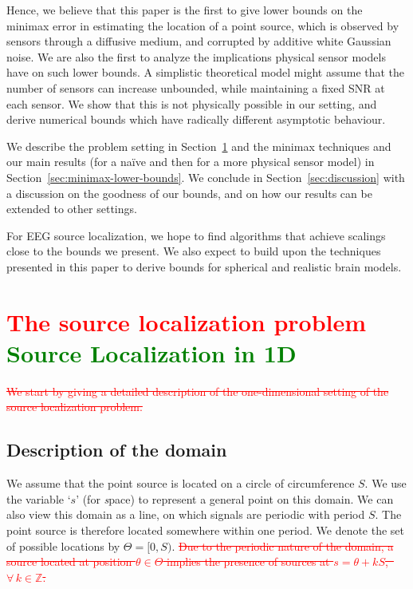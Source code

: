 \documentclass[conference,letterpaper]{IEEEtran}
\begin{document}
Hence, we believe that this paper is the first to give lower bounds on the
minimax error in estimating the location of a point source, which is observed
by sensors through a diffusive medium, and corrupted by additive white Gaussian
noise. We are also the first to analyze the implications physical sensor models
have on such lower bounds. A simplistic theoretical model might assume that the
number of sensors can increase unbounded, while maintaining a fixed SNR at each
sensor. We show that this is not physically possible in our setting, and derive
numerical bounds which have radically different asymptotic behaviour.

We describe the problem setting in Section~\ref{sec:source-localization} and
the minimax techniques and our main results (for a na\"ive and then for a more
physical sensor model) in Section~\ref{sec:minimax-lower-bounds}. We conclude
in Section~\ref{sec:discussion} with a discussion on the goodness of our
bounds, and on how our results can be extended to other settings.

For EEG source localization, we hope to find algorithms that achieve scalings
close to the bounds we present.  We also expect to build upon the techniques
presented in this paper to derive bounds for spherical and realistic brain
models.

\section{\textcolor{red}{The source localization problem} \textcolor{green}{Source Localization in 1D}}
\label{sec:source-localization}

\textcolor{red}{\sout{We start by giving a detailed description of the one-dimensional setting of the
source localization problem.}}

\subsection{Description of the domain}

We assume that the point source is located on a circle of circumference $S$. We
use the variable `$s$' (for \emph{s}pace) to represent a general point on this
domain. We can also view this domain as a line, on which signals are periodic
with period $S$.  The point source is therefore located somewhere within one
period. We denote the set of possible locations by $\Theta = [0, S)$.
\textcolor{red}{\sout{Due to
the periodic nature of the domain, a source located at position $\theta \in
\Theta$ implies the presence of sources at $s = \theta + kS$,~$\forall \, k \in
\mathbb Z$.}}
\end{document}
